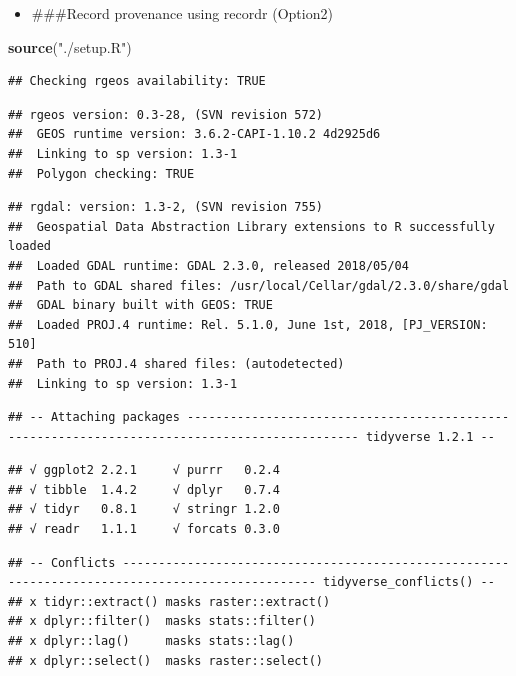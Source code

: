 \documentclass[]{article}
\newenvironment{Shaded}{\begin{snugshade}}{\end{snugshade}}
\newcommand{\KeywordTok}[1]{\textcolor[rgb]{0.13,0.29,0.53}{\textbf{#1}}}
\newcommand{\NormalTok}[1]{#1}
\newcommand{\StringTok}[1]{\textcolor[rgb]{0.31,0.60,0.02}{#1}}
\providecommand{\tightlist}{%
  \setlength{\itemsep}{0pt}\setlength{\parskip}{0pt}}
\begin{document}
\begin{itemize}
\tightlist
\item
  \#\#\#Record provenance using recordr (Option2)
\end{itemize}

\begin{Shaded}
\begin{Highlighting}[]
\KeywordTok{source}\NormalTok{(}\StringTok{"./setup.R"}\NormalTok{)}
\end{Highlighting}
\end{Shaded}

\begin{verbatim}
## Checking rgeos availability: TRUE
\end{verbatim}

\begin{verbatim}
## rgeos version: 0.3-28, (SVN revision 572)
##  GEOS runtime version: 3.6.2-CAPI-1.10.2 4d2925d6 
##  Linking to sp version: 1.3-1 
##  Polygon checking: TRUE
\end{verbatim}

\begin{verbatim}
## rgdal: version: 1.3-2, (SVN revision 755)
##  Geospatial Data Abstraction Library extensions to R successfully loaded
##  Loaded GDAL runtime: GDAL 2.3.0, released 2018/05/04
##  Path to GDAL shared files: /usr/local/Cellar/gdal/2.3.0/share/gdal
##  GDAL binary built with GEOS: TRUE 
##  Loaded PROJ.4 runtime: Rel. 5.1.0, June 1st, 2018, [PJ_VERSION: 510]
##  Path to PROJ.4 shared files: (autodetected)
##  Linking to sp version: 1.3-1
\end{verbatim}

\begin{verbatim}
## -- Attaching packages ---------------------------------------------------------------------------------------------- tidyverse 1.2.1 --
\end{verbatim}

\begin{verbatim}
## √ ggplot2 2.2.1     √ purrr   0.2.4
## √ tibble  1.4.2     √ dplyr   0.7.4
## √ tidyr   0.8.1     √ stringr 1.2.0
## √ readr   1.1.1     √ forcats 0.3.0
\end{verbatim}

\begin{verbatim}
## -- Conflicts ------------------------------------------------------------------------------------------------- tidyverse_conflicts() --
## x tidyr::extract() masks raster::extract()
## x dplyr::filter()  masks stats::filter()
## x dplyr::lag()     masks stats::lag()
## x dplyr::select()  masks raster::select()
\end{verbatim}
\end{document}
